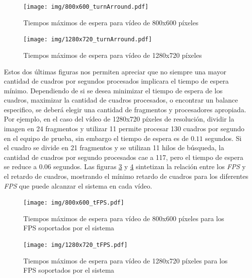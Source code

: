 \begin{figure}[!h]

	\texttt{[image: img/800x600\_turnArround.pdf]}
	\caption{Tiempos máximos de espera para vídeo de 800x600 píxeles}
	\label{800turnArround}

\end{figure}


\begin{figure}[!h]

	\texttt{[image: img/1280x720\_turnArround.pdf]}
	\caption{Tiempos máximos de espera para vídeo de 1280x720 píxeles}
	\label{1280turnArround}

\end{figure}

Estos dos últimas figuras nos permiten apreciar que no siempre una mayor
cantidad de cuadros por segundos procesados implicara el tiempo de espera
mínimo. Dependiendo de si se desea minimizar el tiempo de espera de los cuadros,
maximizar la cantidad de cuadros procesados, o encontrar un balance especifico,
se deberá elegir una cantidad de fragmentos y procesadores apropiada. Por
ejemplo, en el caso del vídeo de 1280x720 píxeles de resolución, dividir la
imagen en 24 fragmentos y utilizar 11 permite procesar 130 cuadros por segundo en
el equipo de prueba, sin embargo el tiempo de espera es de $0.11$ segundos. Si
el cuadro se divide en 21 fragmentos y se utilizan 11 hilos de búsqueda, la
cantidad de cuadros por segundo procesados cae a 117, pero el tiempo de espera
se reduce a $0.06$ segundos. Las figuras \ref{800tFPS} y \ref{1280tFPS}
sintetizan la relación entre los \emph{FPS} y el retardo de cuadros, mostrando
el mínimo retardo de cuadros para los diferentes \emph{FPS} que puede alcanzar
el sistema en cada vídeo.

\begin{figure}[!h]

	\texttt{[image: img/800x600\_tFPS.pdf]}
	\caption{Tiempos máximos de espera para vídeo de 800x600 píxeles para
	los FPS soportados por el sistema}
	\label{800tFPS}

\end{figure}

\begin{figure}[!h]

	\texttt{[image: img/1280x720\_tFPS.pdf]}
	\caption{Tiempos máximos de espera para vídeo de 1280x720 píxeles para
	los FPS soportados por el sistema}
	\label{1280tFPS}

\end{figure}

